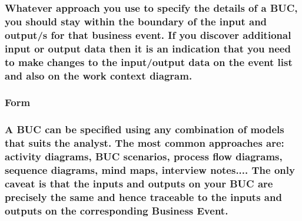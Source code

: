 \documentclass[
]{article}
\begin{document}
\hypertarget{whatever-approach-you-use-to-specify-the-details-of-a-buc-you-should-stay-within-the-boundary-of-the-input-and-outputs-for-that-business-event.-if-you-discover-additional-input-or-output-data-then-it-is-an-indication-that-you-need-to-make-changes-to-the-inputoutput-data-on-the-event-list-and-also-on-the-work-context-diagram.}{%
\subsubsection{Whatever approach you use to specify the details of a
BUC, you should stay within the boundary of the input and output/s for
that business event. If you discover additional input or output data
then it is an indication that you need to make changes to the
input/output data on the event list and also on the work context
diagram.}\label{whatever-approach-you-use-to-specify-the-details-of-a-buc-you-should-stay-within-the-boundary-of-the-input-and-outputs-for-that-business-event.-if-you-discover-additional-input-or-output-data-then-it-is-an-indication-that-you-need-to-make-changes-to-the-inputoutput-data-on-the-event-list-and-also-on-the-work-context-diagram.}}

\hypertarget{form-23}{%
\subsubsection{Form}\label{form-23}}

\hypertarget{a-buc-can-be-specified-using-any-combination-of-models-that-suits-the-analyst.-the-most-common-approaches-are-activity-diagrams-buc-scenarios-process-flow-diagrams-sequence-diagrams-mind-maps-interview-notes....-the-only-caveat-is-that-the-inputs-and-outputs-on-your-buc-are-precisely-the-same-and-hence-traceable-to-the-inputs-and-outputs-on-the-corresponding-business-event.}{%
\subsubsection{A BUC can be specified using any combination of models
that suits the analyst. The most common approaches are: activity
diagrams, BUC scenarios, process flow diagrams, sequence diagrams, mind
maps, interview notes.... The only caveat is that the inputs and outputs
on your BUC are precisely the same and hence traceable to the inputs and
outputs on the corresponding Business
Event.}\label{a-buc-can-be-specified-using-any-combination-of-models-that-suits-the-analyst.-the-most-common-approaches-are-activity-diagrams-buc-scenarios-process-flow-diagrams-sequence-diagrams-mind-maps-interview-notes....-the-only-caveat-is-that-the-inputs-and-outputs-on-your-buc-are-precisely-the-same-and-hence-traceable-to-the-inputs-and-outputs-on-the-corresponding-business-event.}}
\end{document}
